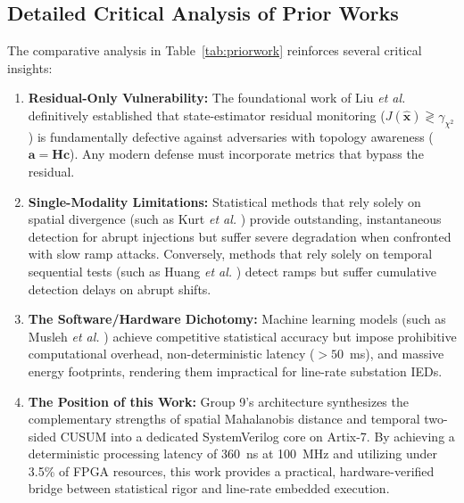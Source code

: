 \documentclass[12pt,a4paper]{report}
\begin{document}
\subsection{Detailed Critical Analysis of Prior Works}
The comparative analysis in Table~\ref{tab:priorwork} reinforces several critical insights:
\begin{enumerate}
    \item \textbf{Residual-Only Vulnerability:} The foundational work of Liu \textit{et al.} \cite{liu2009}
    definitively established that state-estimator residual monitoring ($J(\hat{\boldsymbol{x}}) \gtrless \gamma_{\chi^2}$)
    is fundamentally defective against adversaries with topology awareness ($\boldsymbol{a} = \boldsymbol{H}\boldsymbol{c}$).
    Any modern defense must incorporate metrics that bypass the residual.
    \item \textbf{Single-Modality Limitations:} Statistical methods that rely solely on spatial
    divergence (such as Kurt \textit{et al.} \cite{kurt2020}) provide outstanding, instantaneous
    detection for abrupt injections but suffer severe degradation when confronted with slow ramp
    attacks. Conversely, methods that rely solely on temporal sequential tests (such as Huang
    \textit{et al.} \cite{huang2016}) detect ramps but suffer cumulative detection delays on abrupt shifts.
    \item \textbf{The Software/Hardware Dichotomy:} Machine learning models (such as Musleh
    \textit{et al.} \cite{musleh2023}) achieve competitive statistical accuracy but impose prohibitive
    computational overhead, non-deterministic latency ($> 50$~ms), and massive energy footprints,
    rendering them impractical for line-rate substation IEDs.
    \item \textbf{The Position of this Work:} Group 9's architecture synthesizes the complementary
    strengths of spatial Mahalanobis distance and temporal two-sided CUSUM into a dedicated
    SystemVerilog core on Artix-7. By achieving a deterministic processing latency of 360~ns
    at 100~MHz and utilizing under 3.5\% of FPGA resources, this work provides a practical,
    hardware-verified bridge between statistical rigor and line-rate embedded execution.
\end{enumerate}
\end{document}
